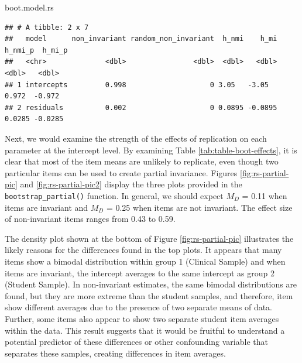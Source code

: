 \documentclass[
  man]{apa7}
\newenvironment{Shaded}{\begin{snugshade}}{\end{snugshade}}
\newcommand{\NormalTok}[1]{#1}
\begin{document}
\normalsize

\normalsize

\begin{Shaded}
\begin{Highlighting}[]
\NormalTok{boot.model.rs}
\end{Highlighting}
\end{Shaded}

\normalsize

\begin{verbatim}
## # A tibble: 2 x 7
##   model      non_invariant random_non_invariant  h_nmi    h_mi h_nmi_p  h_mi_p
##   <chr>              <dbl>                <dbl>  <dbl>   <dbl>   <dbl>   <dbl>
## 1 intercepts         0.998                    0 3.05   -3.05    0.972  -0.972 
## 2 residuals          0.002                    0 0.0895 -0.0895  0.0285 -0.0285
\end{verbatim}

Next, we would examine the strength of the effects of replication on each parameter at the intercept level. By examining Table \ref{tab:table-boot-effects}, it is clear that most of the item means are unlikely to replicate, even though two particular items can be used to create partial invariance. Figures \ref{fig:rs-partial-pic} and \ref{fig:rs-partial-pic2} display the three plots provided in the \texttt{bootstrap\_partial()} function. In general, we should expect \(M_{D}\) = 0.11 when items are invariant and \(M_{D}\) = 0.25 when items are not invariant. The effect size of non-invariant items ranges from 0.43 to 0.59.

The density plot shown at the bottom of Figure \ref{fig:rs-partial-pic} illustrates the likely reasons for the differences found in the top plots. It appears that many items show a bimodal distribution within group 1 (Clinical Sample) and when items are invariant, the intercept averages to the same intercept as group 2 (Student Sample). In non-invariant estimates, the same bimodal distributions are found, but they are more extreme than the student samples, and therefore, item show different averages due to the presence of two separate means of data. Further, some items also appear to show two separate student item averages within the data. This result suggests that it would be fruitful to understand a potential predictor of these differences or other confounding variable that separates these samples, creating differences in item averages.
\end{document}

